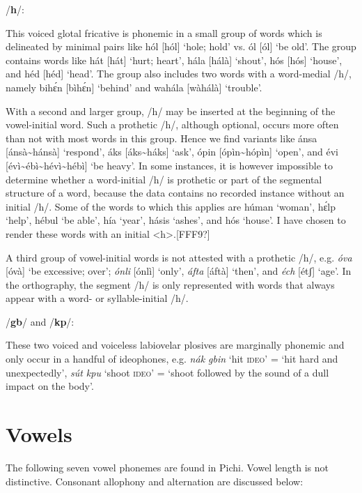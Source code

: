 /\textbf{h}/:

This voiced glotal fricative is phonemic in a small group of words which is delineated by minimal pairs like hól [hól] ‘hole; hold’ vs. ól [ól] ‘be old’. The group contains words like hát [hát] ‘hurt; heart’, hála [hálà] ‘shout’, hós [hós] ‘house’, and héd [héd] ‘head’. The group also includes two words with a word-medial /h/, namely bihɛ́n [bìhɛ́n] ‘behind’ and wahála [wàhálà] ‘trouble’. 


With a second and larger group, /h/ may be inserted at the beginning of the vowel-initial word. Such a prothetic /h/, although optional, occurs more often than not with most words in this group. Hence we find variants like ánsa [ánsà{\textasciitilde}hánsà] ‘respond’, áks [áks{\textasciitilde}háks] ‘ask’, ópin [ópìn{\textasciitilde}hópìn] ‘open’, and évi [évì{\textasciitilde}ébì{\textasciitilde}hévì{\textasciitilde}hébì] ‘be heavy’. In some instances, it is however impossible to determine whether a word-initial /h/ is prothetic or part of the segmental structure of a word, because the data contains no recorded instance without an initial /h/. Some of the words to which this applies are húman ‘woman’, hɛ́lp ‘help’, hébul ‘be able’, hía ‘year’, hásis ‘ashes’, and hós ‘house’. I have chosen to render these words with an initial <h>.[FFF9?]



A third group of vowel-initial words is not attested with a prothetic /h/, e.g. \textit{óva} [óvà] ‘be excessive; over’; \textit{ónli} [ónlì] ‘only’, \textit{áfta} [áftà] ‘then’, and \textit{éch} [étʃ] ‘age’. In the orthography, the segment /h/ is only represented with words that always appear with a word- or syllable-initial /h/. 


/\textbf{gb}/ and /\textbf{kp}/:

These two voiced and voiceless labiovelar plosives are marginally phonemic and only occur in a handful of ideophones, e.g.\textit{ nák gbin} ‘hit \textsc{ideo}’ = ‘hit hard and unexpectedly’, \textit{sút kpu} ‘shoot \textsc{ideo’} = ‘shoot followed by the sound of a dull impact on the body’.

\section{Vowels}\label{sec:2.3}

The following seven vowel phonemes are found in Pichi. Vowel length is not distinctive. Consonant allophony and alternation are discussed below:

